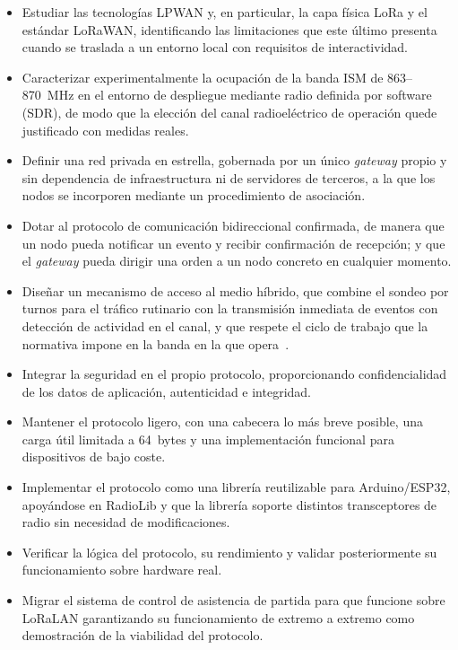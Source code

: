 \begin{itemize}
\item Estudiar las tecnologías LPWAN y, en particular, la capa física LoRa y el estándar LoRaWAN, identificando las limitaciones que este último presenta cuando se traslada a un entorno local con requisitos de interactividad.

\item Caracterizar experimentalmente la ocupación de la banda ISM de 863--870~MHz en el entorno de despliegue mediante radio definida por software (SDR), de modo que la elección del canal radioeléctrico de operación quede justificado con medidas reales.

\item Definir una red privada en estrella, gobernada por un único \textit{gateway} propio y sin dependencia de infraestructura ni de servidores de terceros, a la que los nodos se incorporen mediante un procedimiento de asociación.

\item Dotar al protocolo de comunicación bidireccional confirmada, de manera que un nodo pueda notificar un evento y recibir confirmación de recepción; y que el \textit{gateway} pueda dirigir una orden a un nodo concreto en cualquier momento.

\item Diseñar un mecanismo de acceso al medio híbrido, que combine el sondeo por turnos para el tráfico rutinario con la transmisión inmediata de eventos con detección de actividad en el canal, y que respete el ciclo de trabajo que la normativa impone en la banda en la que opera~\cite{etsien3002202}.

\item Integrar la seguridad en el propio protocolo, proporcionando confidencialidad de los datos de aplicación, autenticidad e integridad.

\item Mantener el protocolo ligero, con una cabecera lo más breve posible, una carga útil limitada a 64~bytes y una implementación funcional para dispositivos de bajo coste.

\item Implementar el protocolo como una librería reutilizable para Arduino/ESP32, apoyándose en RadioLib y que la librería soporte distintos transceptores de radio sin necesidad de modificaciones.

\item Verificar la lógica del protocolo, su rendimiento y validar posteriormente su funcionamiento sobre hardware real.

\item Migrar el sistema de control de asistencia de partida para que funcione sobre LoRaLAN garantizando su funcionamiento de extremo a extremo como demostración de la viabilidad del protocolo.
\end{itemize}

